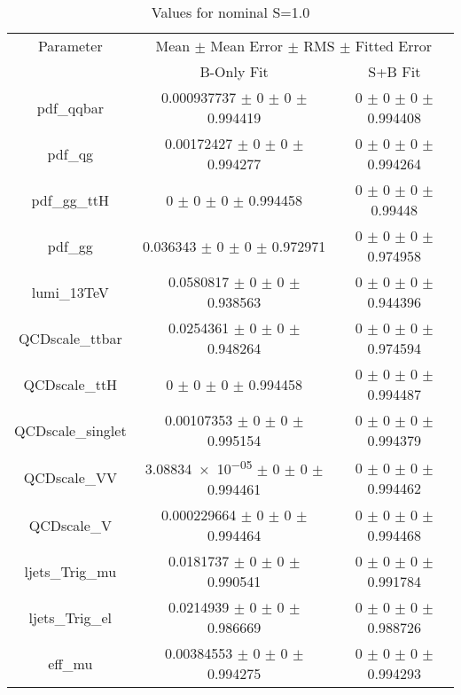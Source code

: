 \begin{table}
\centering
\caption{Values for nominal S=1.0}
\begin{tabular}{ccc}
\toprule
Parameter 	& \multicolumn{2}{c}{Mean $\pm$ Mean Error $\pm$ RMS $\pm$ Fitted Error}\\
 	& B-Only Fit & S+B Fit\\
\midrule
pdf\_qqbar 	& \num{0.000937737} $\pm$ \num{0} $\pm$ \num{0} $\pm$ \num{0.994419} 	& \num{0} $\pm$ \num{0} $\pm$ \num{0} $\pm$ \num{0.994408}\\
pdf\_qg 	& \num{0.00172427} $\pm$ \num{0} $\pm$ \num{0} $\pm$ \num{0.994277} 	& \num{0} $\pm$ \num{0} $\pm$ \num{0} $\pm$ \num{0.994264}\\
pdf\_gg\_ttH 	& \num{0} $\pm$ \num{0} $\pm$ \num{0} $\pm$ \num{0.994458} 	& \num{0} $\pm$ \num{0} $\pm$ \num{0} $\pm$ \num{0.99448}\\
pdf\_gg 	& \num{0.036343} $\pm$ \num{0} $\pm$ \num{0} $\pm$ \num{0.972971} 	& \num{0} $\pm$ \num{0} $\pm$ \num{0} $\pm$ \num{0.974958}\\
lumi\_13TeV 	& \num{0.0580817} $\pm$ \num{0} $\pm$ \num{0} $\pm$ \num{0.938563} 	& \num{0} $\pm$ \num{0} $\pm$ \num{0} $\pm$ \num{0.944396}\\
QCDscale\_ttbar 	& \num{0.0254361} $\pm$ \num{0} $\pm$ \num{0} $\pm$ \num{0.948264} 	& \num{0} $\pm$ \num{0} $\pm$ \num{0} $\pm$ \num{0.974594}\\
QCDscale\_ttH 	& \num{0} $\pm$ \num{0} $\pm$ \num{0} $\pm$ \num{0.994458} 	& \num{0} $\pm$ \num{0} $\pm$ \num{0} $\pm$ \num{0.994487}\\
QCDscale\_singlet 	& \num{0.00107353} $\pm$ \num{0} $\pm$ \num{0} $\pm$ \num{0.995154} 	& \num{0} $\pm$ \num{0} $\pm$ \num{0} $\pm$ \num{0.994379}\\
QCDscale\_VV 	& \num{3.08834e-05} $\pm$ \num{0} $\pm$ \num{0} $\pm$ \num{0.994461} 	& \num{0} $\pm$ \num{0} $\pm$ \num{0} $\pm$ \num{0.994462}\\
QCDscale\_V 	& \num{0.000229664} $\pm$ \num{0} $\pm$ \num{0} $\pm$ \num{0.994464} 	& \num{0} $\pm$ \num{0} $\pm$ \num{0} $\pm$ \num{0.994468}\\
ljets\_Trig\_mu 	& \num{0.0181737} $\pm$ \num{0} $\pm$ \num{0} $\pm$ \num{0.990541} 	& \num{0} $\pm$ \num{0} $\pm$ \num{0} $\pm$ \num{0.991784}\\
ljets\_Trig\_el 	& \num{0.0214939} $\pm$ \num{0} $\pm$ \num{0} $\pm$ \num{0.986669} 	& \num{0} $\pm$ \num{0} $\pm$ \num{0} $\pm$ \num{0.988726}\\
eff\_mu 	& \num{0.00384553} $\pm$ \num{0} $\pm$ \num{0} $\pm$ \num{0.994275} 	& \num{0} $\pm$ \num{0} $\pm$ \num{0} $\pm$ \num{0.994293}\\

\end{tabular}
\end{table}
